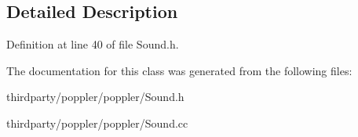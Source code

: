 \subsection{Detailed Description}


Definition at line 40 of file Sound.\+h.



The documentation for this class was generated from the following files\+:\begin{DoxyCompactItemize}
\item 
thirdparty/poppler/poppler/Sound.\+h\item 
thirdparty/poppler/poppler/Sound.\+cc\end{DoxyCompactItemize}
